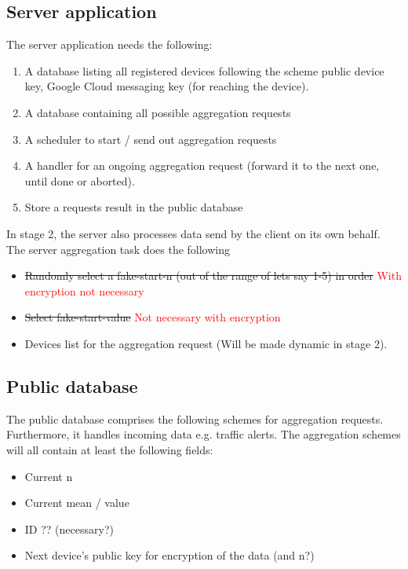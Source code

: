 \subsection{Server application}
The server application needs the following:
\begin{enumerate}
	\item A database listing all registered devices following the scheme {public device key, Google Cloud messaging key (for reaching the device)}.
	\item A database containing all possible aggregation requests
	\item A scheduler to start / send out aggregation requests
	\item A handler for an ongoing aggregation request (forward it to the next one, until done or aborted).
	\item Store a requests result in the public database
\end{enumerate}
In stage 2, the server also processes data send by the client on its own behalf.
The server aggregation task does the following
\begin{itemize}
	\item \sout{Randomly select a fake-start-n (out of the range of lets say 1-5) in order } \textcolor{red}{With encryption not necessary}
	\item \sout{Select fake-start-value} \textcolor{red}{Not necessary with encryption}
	\item Devices list for the aggregation request (Will be made dynamic in stage 2).
\end{itemize}

\subsection{Public database}
The public database comprises the following schemes for aggregation requests.
Furthermore, it handles incoming data e.g. traffic alerts.
The aggregation schemes will all contain at least the following fields:
\begin{itemize}
	\item Current n
	\item Current mean / value
	\item ID ?? (necessary?)
	\item Next device's public key for encryption of the data (and n?)
\end{itemize}